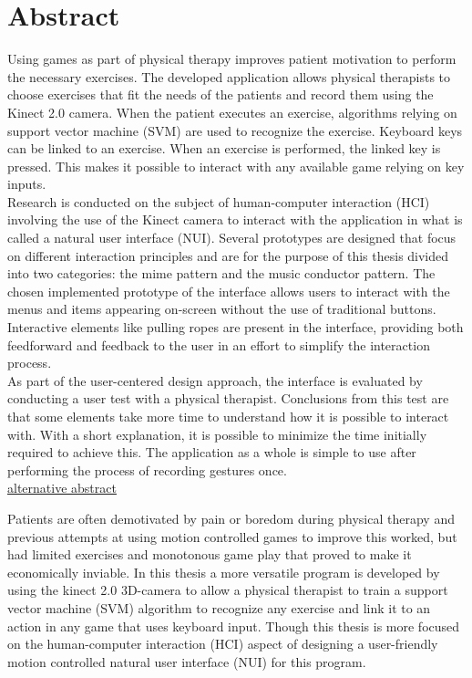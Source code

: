 \chapter*{Abstract}

Using games as part of physical therapy improves patient motivation to perform the necessary exercises. The developed application allows physical therapists to choose exercises that fit the needs of the patients and record them using the Kinect 2.0 camera. When the patient executes an exercise, algorithms relying on support vector machine (SVM) are used to recognize the exercise. Keyboard keys can be linked to an exercise. When an exercise is performed, the linked key is pressed. This makes it possible to interact with any available game relying on key inputs.\\

Research is conducted on the subject of human-computer interaction (HCI) involving the use of the Kinect camera to interact with the application in what is called a natural user interface (NUI). Several prototypes are designed that focus on different interaction principles and are for the purpose of this thesis divided into two categories: the mime pattern and the music conductor pattern. The chosen implemented prototype of the interface allows users to interact with the menus and items appearing on-screen without the use of traditional buttons. Interactive elements like pulling ropes are present in the interface, providing both feedforward and feedback to the user in an effort to simplify the interaction process.\\

As part of the user-centered design approach, the interface is evaluated by conducting a user test with a physical therapist. Conclusions from this test are that some elements take more time to understand how it is possible to interact with. With a short explanation, it is possible to minimize the time initially required to achieve this. The application as a whole is simple to use after performing the process of recording gestures once.\\

\underline{alternative abstract}

Patients are often demotivated by pain or boredom during physical therapy and previous attempts at using motion controlled games to improve this worked, but had limited exercises and monotonous game play that proved to make it economically inviable. In this thesis a more versatile program is developed by using the kinect 2.0 3D-camera to allow a physical therapist to train a support vector machine (SVM) algorithm to recognize any exercise and link it to an action in any game that uses keyboard input. Though this thesis is more focused on the human-computer interaction (HCI) aspect of designing a user-friendly motion controlled natural user interface (NUI) for this program. \\

